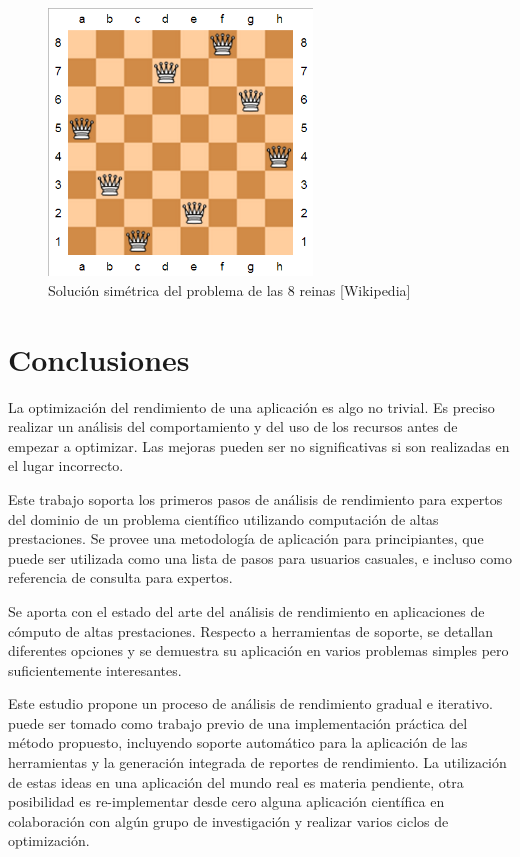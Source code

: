 \documentclass[a4paper]{report}
\begin{document}
\begin{figure}[H]
\centering
\includegraphics[width=7cm]{queen.png}
\caption{Solución simétrica del problema de las 8 reinas [Wikipedia]}
\end{figure}

\chapter{Conclusiones}\label{chapter:conclusions}

La optimización del rendimiento de una aplicación es algo no trivial.
Es preciso realizar un análisis del comportamiento y del uso de los recursos antes de
empezar a optimizar. Las mejoras pueden ser no significativas si son realizadas en el lugar incorrecto.

\bigskip

Este trabajo soporta los primeros pasos de análisis de rendimiento para expertos del dominio de un problema científico utilizando computación de altas prestaciones. Se provee una metodología de aplicación para principiantes, que puede ser utilizada como una lista de pasos para usuarios casuales, e incluso como referencia de consulta para expertos.

\bigskip

Se aporta con el estado del arte del análisis de rendimiento en
aplicaciones de cómputo de altas prestaciones. Respecto a herramientas de soporte, se detallan
diferentes opciones y se demuestra su aplicación en varios problemas simples pero suficientemente interesantes. 

\bigskip

Este estudio propone un proceso de análisis de rendimiento gradual e iterativo.
puede ser tomado como trabajo previo de una implementación práctica del método propuesto,
incluyendo soporte automático para la aplicación de las herramientas y la generación integrada de
reportes de rendimiento. La utilización de estas ideas en una aplicación del mundo real es materia
pendiente, otra posibilidad es re-implementar desde cero alguna aplicación
científica en colaboración con algún grupo de investigación y realizar
varios ciclos de optimización.


\end{document}
